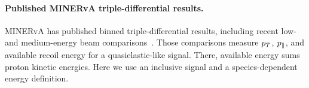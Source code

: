 \paragraph{Published MINERvA triple-differential results.} MINERvA has published binned triple-differential results, including recent low- and medium-energy beam comparisons~\cite{MINERvA:2026qeleme}. Those comparisons measure $p_{T}$, $p_{\parallel}$, and available recoil energy for a quasielastic-like signal. There, available energy sums proton kinetic energies. Here we use an inclusive signal and a species-dependent energy definition.

